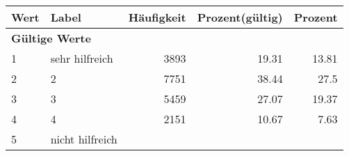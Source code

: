      \begin{longtable}{lXrrr}
     \toprule
     \textbf{Wert} & \textbf{Label} & \textbf{Häufigkeit} & \textbf{Prozent(gültig)} & \textbf{Prozent} \\
     \endhead
     \midrule
     \multicolumn{5}{l}{\textbf{Gültige Werte}}\\

     1 &
     \multicolumn{1}{X}{ sehr hilfreich   } &


       \num{3893} &
       \num[round-mode=places,round-precision=2]{19,31} &
         \num[round-mode=places,round-precision=2]{13,81} \\

     2 &
     \multicolumn{1}{X}{ 2   } &


       \num{7751} &
       \num[round-mode=places,round-precision=2]{38,44} &
         \num[round-mode=places,round-precision=2]{27,5} \\

     3 &
     \multicolumn{1}{X}{ 3   } &


       \num{5459} &
       \num[round-mode=places,round-precision=2]{27,07} &
         \num[round-mode=places,round-precision=2]{19,37} \\

     4 &
     \multicolumn{1}{X}{ 4   } &


       \num{2151} &
       \num[round-mode=places,round-precision=2]{10,67} &
         \num[round-mode=places,round-precision=2]{7,63} \\

     5 &
     \multicolumn{1}{X}{ nicht hilfreich   } &



\end{longtable}
